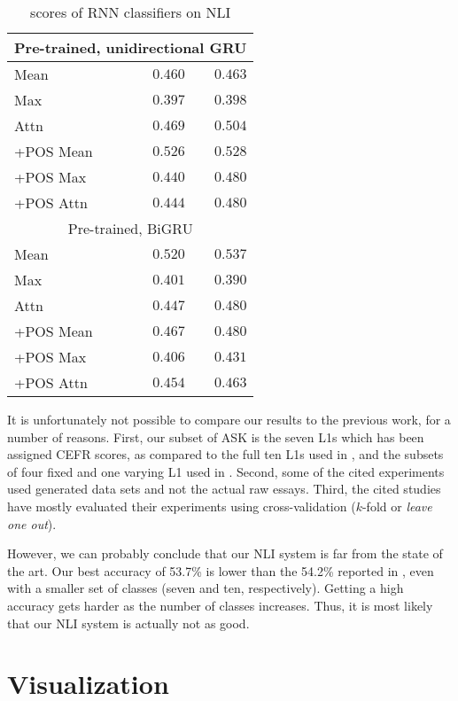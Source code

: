 \begin{table}
\begin{tabular}{lrr}
    \midrule \multicolumn{3}{c}{Pre-trained, unidirectional GRU} \\ \midrule
    Mean & $0.460$ & $0.463$ \\
    Max & $0.397$ & $0.398$ \\
    Attn & $0.469$ & $0.504$ \\
    +POS Mean & $\mathbf{0.526}$ & $0.528$ \\
    +POS Max & $0.440$ & $0.480$ \\
    +POS Attn & $0.444$ & $0.480$ \\
    \midrule \multicolumn{3}{c}{Pre-trained, BiGRU} \\ \midrule
    Mean & $0.520$ & $\mathbf{0.537}$ \\
    Max & $0.401$ & $0.390$ \\
    Attn & $0.447$ & $0.480$ \\
    +POS Mean & $0.467$ & $0.480$ \\
    +POS Max & $0.406$ & $0.431$ \\
    +POS Attn & $0.454$ & $0.463$ \\
    \bottomrule
  \end{tabular}
  \caption{\FI scores of RNN classifiers on NLI}
  \label{tab:rnn-nli-results}
\end{table}

It is unfortunately not possible to compare our results to the previous work,
for a number of reasons. First, our subset of ASK is the seven \acp{L1} which
has been assigned CEFR scores, as compared to the full ten \acp{L1} used in
\autocite{malmasi15,malmasi17,malmasi2018native}, and the subsets of four fixed
and one varying \ac{L1} used in \autocite{pepper2012,ionescu2016string}. Second,
some of the cited experiments used generated data sets and not the actual raw
essays. Third, the cited studies have mostly evaluated their experiments using
cross-validation ($k$-fold or \emph{leave one out}).

However, we can probably conclude that our \ac{NLI} system is far from the
state of the art. Our best accuracy of 53.7\% is lower than the 54.2\%
reported in \textcite{malmasi2018native}, even with a smaller set of classes
(seven and ten, respectively). Getting a high accuracy gets harder as the
number of classes increases. Thus, it is most likely that our \ac{NLI} system
is actually not as good.


\section{Visualization}

